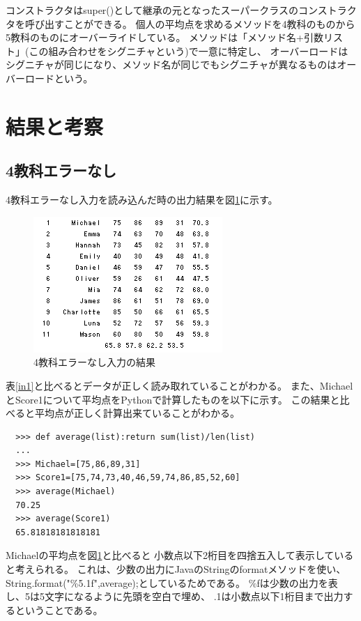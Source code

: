 \documentclass[dvipdfmx]{jsarticle}
\begin{document}
コンストラクタはsuper()として継承の元となったスーパークラスのコンストラクタを呼び出すことができる。
個人の平均点を求めるメソッドを4教科のものから5教科のものにオーバーライドしている。
メソッドは「メソッド名+引数リスト」(この組み合わせをシグニチャという)で一意に特定し、
オーバーロードはシグニチャが同じになり、メソッド名が同じでもシグニチャが異なるものはオーバーロードという。


\section{結果と考察}
\subsection{4教科エラーなし}
4教科エラーなし入力を読み込んだ時の出力結果を図\ref{res1}に示す。
\begin{figure}[H]
  \centering
  \includegraphics[width=0.6\hsize]{../pic/res1.png}
  \caption{4教科エラーなし入力の結果}
  \label{res1}
\end{figure}

表\ref{in1}と比べるとデータが正しく読み取れていることがわかる。
また、MichaelとScore1について平均点をPythonで計算したものを以下に示す。
この結果と比べると平均点が正しく計算出来ていることがわかる。
\begin{lstlisting}
  >>> def average(list):return sum(list)/len(list)
  ...
  >>> Michael=[75,86,89,31]
  >>> Score1=[75,74,73,40,46,59,74,86,85,52,60]
  >>> average(Michael)
  70.25
  >>> average(Score1)
  65.81818181818181
\end{lstlisting}

Michaelの平均点を図\ref{res1}と比べると
小数点以下2桁目を四捨五入して表示していると考えられる。
これは、少数の出力にJavaのStringのformatメソッドを使い、
String.format("\%5.1f",average);としているためである。
\%fは少数の出力を表し、5は5文字になるように先頭を空白で埋め、
.1は小数点以下1桁目まで出力するということである。
\end{document}

